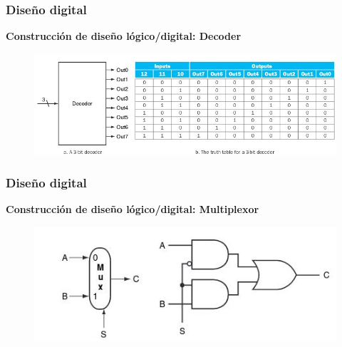 \documentclass[aspectratio=169,compress]{beamer}
\begin{document}
\begin{footnotesize}
\begin{frame}[fragile]
\frametitle{Diseño digital}
\begin{center}\textbf{Construcción de diseño lógico/digital: Decoder}\end{center}
\begin{figure}
\includegraphics[scale=0.4]{images/decoder.jpg} 
\end{figure}
\end{frame}


\begin{frame}[fragile]
\frametitle{Diseño digital}
\begin{center}\textbf{Construcción de diseño lógico/digital: Multiplexor}\end{center}
\begin{figure}
\includegraphics[scale=0.4]{images/multiplexor.jpg} 
\end{figure}
\end{frame}




\end{footnotesize}
\end{document}
